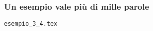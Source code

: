 \begin{frame}
  \frametitle{Un esempio vale pi\`u di mille parole}
	\begin{center}
		\alert{\texttt{esempio\_3\_4.tex}}
	\end{center}
\end{frame}

